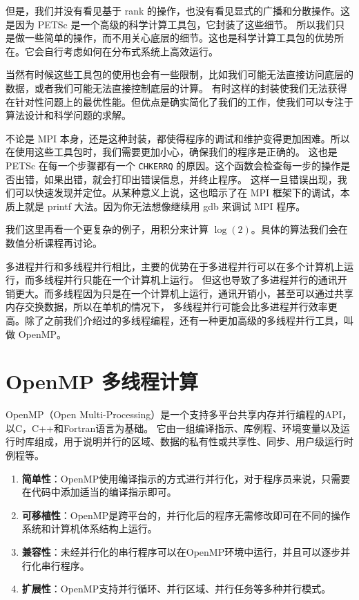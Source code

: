 \documentclass{ctexart}
\begin{document}
但是，我们并没有看见基于 rank 的操作，也没有看见显式的广播和分散操作。这是因为 PETSc 是一个高级的科学计算工具包，它封装了这些细节。
所以我们只是做一些简单的操作，而不用关心底层的细节。这也是科学计算工具包的优势所在。它会自行考虑如何在分布式系统上高效运行。

当然有时候这些工具包的使用也会有一些限制，比如我们可能无法直接访问底层的数据，或者我们可能无法直接控制底层的计算。
有时这样的封装使我们无法获得在针对性问题上的最优性能。但优点是确实简化了我们的工作，使我们可以专注于算法设计和科学问题的求解。

不论是 MPI 本身，还是这种封装，都使得程序的调试和维护变得更加困难。所以在使用这些工具包时，我们需要更加小心，确保我们的程序是正确的。
这也是 PETSc 在每一个步骤都有一个 \texttt{CHKERRQ} 的原因。这个函数会检查每一步的操作是否出错，如果出错，就会打印出错误信息，并终止程序。
这样一旦错误出现，我们可以快速发现并定位。从某种意义上说，这也暗示了在 MPI 框架下的调试，本质上就是 printf 大法。因为你无法想像继续用 gdb 
来调试 MPI 程序。

我们这里再看一个更复杂的例子，用积分来计算 $\log(2)$。具体的算法我们会在数值分析课程再讨论。

多进程并行和多线程并行相比，主要的优势在于多进程并行可以在多个计算机上运行，而多线程并行只能在一个计算机上运行。
但这也导致了多进程并行的通讯开销更大。而多线程因为只是在一个计算机上运行，通讯开销小，甚至可以通过共享内存交换数据，所以在单机的情况下，
多线程并行可能会比多进程并行效率更高。除了之前我们介绍过的多线程编程，还有一种更加高级的多线程并行工具，叫做 OpenMP。

\section{OpenMP 多线程计算}  
  
OpenMP（Open Multi-Processing）是一个支持多平台共享内存并行编程的API，以C，C++和Fortran语言为基础。
它由一组编译指示、库例程、环境变量以及运行时库组成，用于说明并行的区域、数据的私有性或共享性、同步、用户级运行时例程等。  
  
  
\begin{enumerate}  
    \item \textbf{简单性}：OpenMP使用编译指示的方式进行并行化，对于程序员来说，只需要在代码中添加适当的编译指示即可。  
    \item \textbf{可移植性}：OpenMP是跨平台的，并行化后的程序无需修改即可在不同的操作系统和计算机体系结构上运行。  
    \item \textbf{兼容性}：未经并行化的串行程序可以在OpenMP环境中运行，并且可以逐步并行化串行程序。  
    \item \textbf{扩展性}：OpenMP支持并行循环、并行区域、并行任务等多种并行模式。  
\end{enumerate}  
    
\end{document}
